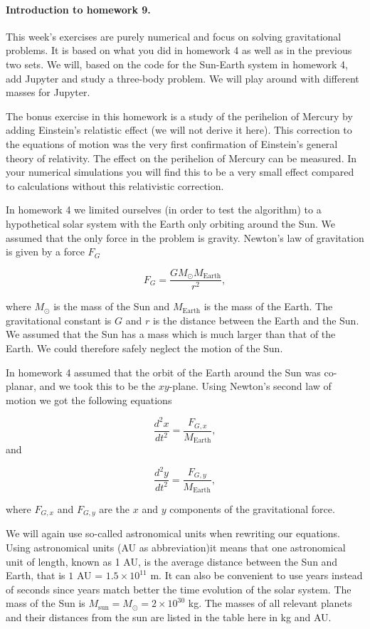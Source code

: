 \documentclass[%
oneside,                 %
final,                   %
10pt]{article}
\begin{document}
\noindent
\paragraph{Introduction to homework 9.}
This week's exercises are purely numerical and focus on solving
gravitational problems. It is based on what you did in homework 4 as
well as in the previous two sets. We will, based on the code for the
Sun-Earth system in homework 4, add Jupyter and study a three-body
problem.  We will play around with different masses for Jupyter.

The bonus exercise in this homework is a study of the perihelion of
Mercury by adding Einstein's relatistic effect (we will not derive it
here). This correction to the equations of motion was the very first
confirmation of Einstein's general theory of relativity.  The effect
on the perihelion of Mercury can be measured. In your numerical
simulations you will find this to be a very small effect compared to
calculations without this relativistic correction.



In homework 4 we limited ourselves (in order to test the algorithm) to
a hypothetical solar system with the Earth only orbiting around the
Sun. We assumed that the only force in the problem is
gravity. Newton's law of gravitation is given by a force $F_G$

\[
F_G=\frac{GM_{\odot}M_{\mathrm{Earth}}}{r^2},
\]

where $M_{\odot}$ is the mass of the Sun and $M_{\mathrm{Earth}}$ is
the mass of the Earth. The gravitational constant is $G$ and $r$ is
the distance between the Earth and the Sun.  We assumed that the Sun
has a mass which is much larger than that of the Earth. We could
therefore safely neglect the motion of the Sun.

In homework 4 assumed that the orbit of the Earth around the Sun 
was co-planar, and we took this to be the $xy$-plane.
Using Newton's second law of motion we got the following equations

\[
\frac{d^2x}{dt^2}=\frac{F_{G,x}}{M_{\mathrm{Earth}}},
\]
and

\[
\frac{d^2y}{dt^2}=\frac{F_{G,y}}{M_{\mathrm{Earth}}},
\]

where $F_{G,x}$ and $F_{G,y}$ are the $x$ and $y$ components of the
gravitational force.

We will again use so-called astronomical units when rewriting our
equations.  Using astronomical units (AU as abbreviation)it means that
one astronomical unit of length, known as 1 AU, is the average
distance between the Sun and Earth, that is $1$ AU = $1.5\times
10^{11}$ m.  It can also be convenient to use years instead of seconds
since years match better the time evolution of the solar system. The
mass of the Sun is $M_{\mathrm{sun}}=M_{\odot}=2\times 10^{30}$
kg. The masses of all relevant planets and their distances from the
sun are listed in the table here in kg and AU.
\end{document}
